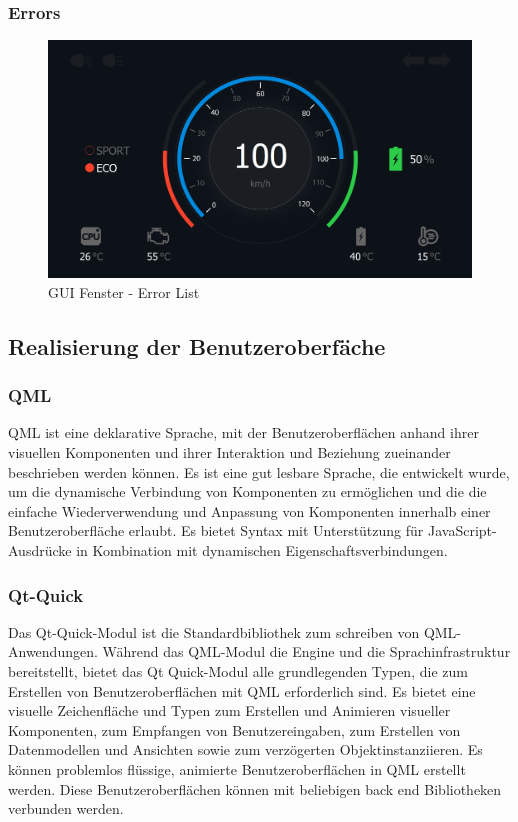 \subsubsection{Errors}

\begin{figure}[H]
	\begin{center}
		\includegraphics[scale=0.24]{figures/hcis/window_dashboard.png}
			\caption{GUI Fenster - Error List}
			\label{fig:pageError}
	\end{center}
\end{figure}

\newpage

\subsection{Realisierung der Benutzeroberfäche}

\subsubsection{QML}
QML ist eine deklarative Sprache, mit der Benutzeroberflächen anhand ihrer visuellen Komponenten und ihrer Interaktion und Beziehung zueinander beschrieben werden können. Es ist eine gut lesbare Sprache, die entwickelt wurde, um die dynamische Verbindung von Komponenten zu ermöglichen und die die einfache Wiederverwendung und Anpassung von Komponenten innerhalb einer Benutzeroberfläche erlaubt. Es bietet  Syntax mit Unterstützung für JavaScript-Ausdrücke in Kombination mit dynamischen Eigenschaftsverbindungen.

\subsubsection{Qt-Quick}
Das Qt-Quick-Modul ist die Standardbibliothek zum schreiben von QML-Anwendungen. Während das QML-Modul die Engine und die Sprachinfrastruktur bereitstellt, bietet das Qt Quick-Modul alle grundlegenden Typen, die zum Erstellen von Benutzeroberflächen mit QML erforderlich sind. Es bietet eine visuelle Zeichenfläche und Typen zum Erstellen und Animieren visueller Komponenten, zum Empfangen von Benutzereingaben, zum Erstellen von Datenmodellen und Ansichten sowie zum verzögerten Objektinstanziieren. Es können problemlos flüssige, animierte Benutzeroberflächen in QML erstellt werden. Diese Benutzeroberflächen können mit beliebigen back end Bibliotheken verbunden werden.

